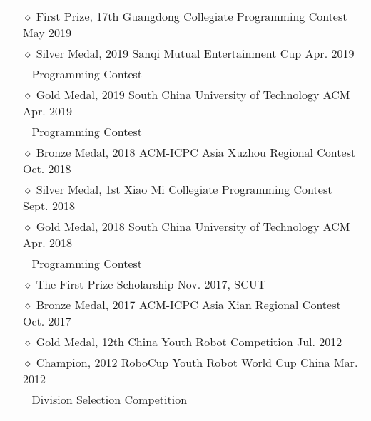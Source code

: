 \documentclass[letterpaper, 11pt]{article}
\begin{document}
\begin{longtable}{p{1in}p{5in}}
& $\diamond$ First Prize, 17th Guangdong Collegiate Programming Contest \hfill May 2019 \\

& $\diamond$ Silver Medal, 2019 Sanqi Mutual Entertainment Cup \hfill Apr. 2019 \\
& $\ \ $ Programming Contest \\

& $\diamond$ Gold Medal, 2019 South China University of Technology ACM \hfill Apr. 2019 \\
& $\ \ $ Programming Contest \\

& $\diamond$ Bronze Medal, 2018 ACM-ICPC Asia Xuzhou Regional Contest \hfill Oct. 2018 \\

& $\diamond$ Silver Medal, 1st Xiao Mi Collegiate Programming Contest \hfill Sept. 2018 \\

& $\diamond$ Gold Medal, 2018 South China University of Technology ACM \hfill Apr. 2018 \\
& $\ \ $ Programming Contest \\

& $\diamond$ The First Prize Scholarship \hfill Nov. 2017, SCUT \\

& $\diamond$ Bronze Medal, 2017 ACM-ICPC Asia Xian Regional Contest \hfill Oct. 2017 \\

& $\diamond$ Gold Medal, 12th China Youth Robot Competition \hfill Jul. 2012 \\

& $\diamond$ Champion, 2012 RoboCup Youth Robot World Cup China \hfill Mar. 2012 \\
& $\ \ $ Division Selection Competition \\

& \\






\end{longtable}
\end{document}
